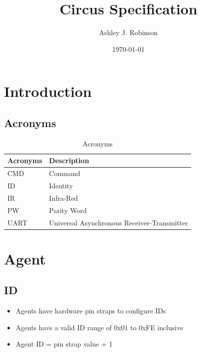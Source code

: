 \documentclass[a4paper]{article}
\title{Circus Specification}
\author{Ashley J. Robinson}
\date{\today}
\begin{document}
\maketitle

\section{Introduction}

   \subsection{Acronyms} 
      \begin{table}[h]
         \centering
         \caption{Acronyms}
         \label{tab_acronyms}
         \begin{tabular}{|l|l|}
            \hline
            \textbf{Acronyms}    &  \textbf{Description}                         \\ \hline  
            CMD                  &  Command                                      \\ \hline
            ID                   &  Identity                                     \\ \hline
            IR                   &  Infra-Red                                    \\ \hline
            PW                   &  Parity Word                                  \\ \hline
            UART                 &  Universal Asynchronous Receiver-Transmitter  \\ \hline  
         \end{tabular}
\end{table}  


\section{Agent}

   \subsection{ID}
      \begin{itemize}
         \item Agents have hardware pin straps to configure IDs
         \item Agents have a valid ID range of 0x01 to 0xFE inclusive
         \item Agent ID = pin strap value + 1
      \end{itemize}
   
\end{document}
